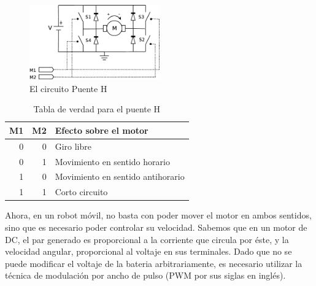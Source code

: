 \documentclass[a4paper,12pt]{article}
\begin{document}
\begin{figure}
  \centering
  \includegraphics[width=0.5\textwidth]{Figures/PuenteH.eps}
  \caption{El circuito Puente H}
  \label{fig:PuenteH}
\end{figure}

\begin{table}
  \centering
  \begin{tabular}{|rrl|}
    \hline
    M1 & M2 & Efecto sobre el motor\\
    \hline
    0 & 0 & Giro libre\\
    0 & 1 & Movimiento en sentido horario\\
    1 & 0 & Movimiento en sentido antihorario\\
    1 & 1 & Corto circuito\\
    \hline
  \end{tabular}
  \caption{Tabla de verdad para el puente H}
  \label{tab:PuenteH}
\end{table}

Ahora, en un robot móvil, no basta con poder mover el motor en ambos sentidos, sino que es necesario poder controlar su velocidad. Sabemos que en un motor de DC, el par generado es proporcional a la corriente que circula por éste, y la velocidad angular, proporcional al voltaje en sus terminales. Dado que no se puede modificar el voltaje de la bateria arbitrariamente, es necesario utilizar la técnica de modulación por ancho de pulso (PWM por sus siglas en inglés). 
\end{document}
